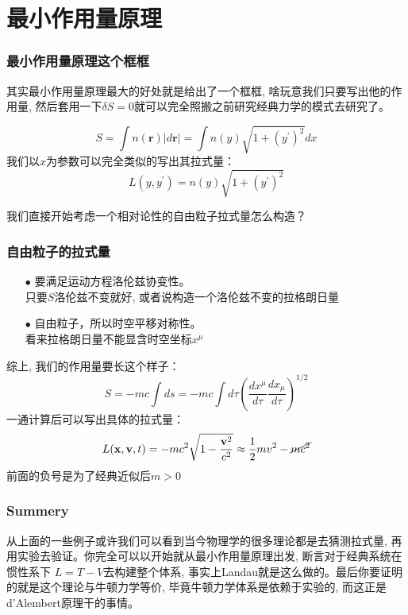 \documentclass{whu-beamer}
\begin{document}
\section{最小作用量原理}
\begin{frame}
  \frametitle{最小作用量原理这个框框}
  其实最小作用量原理最大的好处就是给出了一个框框, 啥玩意我们只要写出他的作用量, 然后套用一下\alert{$\delta S=0$}就可以完全照搬之前研究经典力学的模式去研究了。
  \pause
  \begin{example}[几何光学]
    \begin{equation}
      S=\int n(\mathbf{r})|d\mathbf{r}|=\int n(y)\sqrt{1+(y^\prime)^2}dx
    \end{equation}
    我们以$x$为参数可以完全类似的写出其拉式量：
    \[L(y,y^\prime)=n(y)\sqrt{1+(y^\prime)^2}\]
  \end{example}
  \pause
  我们直接开始考虑一个相对论性的自由粒子拉式量怎么构造？
\end{frame}
\begin{frame}
  \frametitle{自由粒子的拉式量}
  \begin{itemize}
    \item[$\bullet$]  要满足运动方程洛伦兹协变性。\\
    {\small 只要$S$洛伦兹不变就好, 或者说构造一个洛伦兹不变的拉格朗日量}
    \item[$\bullet$]  自由粒子，所以时空平移对称性。\\
    {\small 看来拉格朗日量不能显含时空坐标$x^\mu$}
  \end{itemize}
  综上, 我们的作用量要长这个样子：
  \begin{equation}
    S=-mc\int ds=-mc\int d\tau \left(\frac{dx^\mu}{d\tau}\frac{dx_\mu}{d\tau}\right)^{1/2}
  \end{equation}
  一通计算后可以写出具体的拉式量：
  \begin{equation}
    L(\mathbf{x},\mathbf{v},t)=-mc^2\sqrt{1-\frac{\mathbf{v}^2}{c^2}}\approx\frac{1}{2}mv^2-\cancel{mc^2}
  \end{equation}
  前面的负号是为了经典近似后$m>0$
\end{frame}

\begin{frame}
  \frametitle{Summery}
  从上面的一些例子或许我们可以看到当今物理学的很多理论都是去猜测拉式量, 再用实验去验证。你完全可以以开始就从最小作用量原理出发, 断言对于经典系统在惯性系下
  $L=T-V$去构建整个体系, 事实上Landau就是这么做的。最后你要证明的就是这个理论与牛顿力学等价, 毕竟牛顿力学体系是依赖于实验的, 而这正是d'Alembert原理干的事情。
\end{frame}
\end{document}

